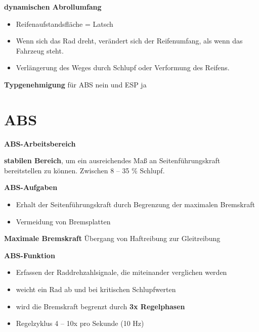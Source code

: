 \textbf{dynamischen Abrollumfang}

\begin{itemize}
\item
  Reifenaufstandsfläche = Latsch
\item
  Wenn sich das Rad dreht, verändert sich der Reifenumfang, als wenn das
  Fahrzeug steht.
\item
  Verlängerung des Weges durch Schlupf oder Verformung des Reifens.
\end{itemize}

\textbf{Typgenehmigung} für ABS nein und ESP ja

\section{ABS}\label{abs}

\textbf{ABS-Arbeitsbereich}

\textbf{stabilen Bereich}, um ein ausreichendes Maß an
Seitenführungskraft bereitstellen zu können. Zwischen 8 -- 35 \%
Schlupf.

\textbf{ABS-Aufgaben}

\begin{itemize}
\item
  Erhalt der Seitenführungskraft durch Begrenzung der maximalen
  Bremskraft
\item
  Vermeidung von Bremsplatten
\end{itemize}

\textbf{Maximale Bremskraft} Übergang von Haftreibung zur Gleitreibung

\textbf{ABS-Funktion}

\begin{itemize}
\item
  Erfassen der Raddrehzahlsignale, die miteinander verglichen werden
\item
  weicht ein Rad ab und bei kritischen Schlupfwerten
\item
  wird die Bremskraft begrenzt durch \textbf{3x Regelphasen}
\item
  Regelzyklus 4 -- 10x pro Sekunde (10 Hz)
\end{itemize}

